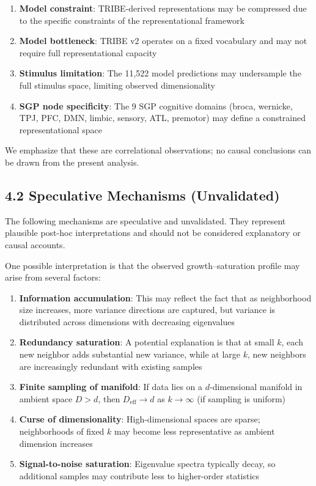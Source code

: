 \begin{enumerate}
	\item \textbf{Model constraint}: TRIBE-derived representations may be compressed due to the specific constraints of the representational framework
	\item \textbf{Model bottleneck}: TRIBE v2 operates on a fixed vocabulary and may not require full representational capacity
	\item \textbf{Stimulus limitation}: The 11,522 model predictions may undersample the full stimulus space, limiting observed dimensionality
	\item \textbf{SGP node specificity}: The 9 SGP cognitive domains (broca, wernicke, TPJ, PFC, DMN, limbic, sensory, ATL, premotor) may define a constrained representational space
\end{enumerate}

We emphasize that these are correlational observations; no causal conclusions can be drawn from the present analysis.

\subsection{4.2 Speculative Mechanisms (Unvalidated)}

The following mechanisms are speculative and unvalidated. They represent plausible post-hoc interpretations and should not be considered explanatory or causal accounts.

One possible interpretation is that the observed growth--saturation profile may arise from several factors:

\begin{enumerate}
	\item \textbf{Information accumulation}: This may reflect the fact that as neighborhood size increases, more variance directions are captured, but variance is distributed across dimensions with decreasing eigenvalues

	\item \textbf{Redundancy saturation}: A potential explanation is that at small $k$, each new neighbor adds substantial new variance, while at large $k$, new neighbors are increasingly redundant with existing samples

	\item \textbf{Finite sampling of manifold}: If data lies on a $d$-dimensional manifold in ambient space $D > d$, then $D_{\mathrm{eff}} \to d$ as $k \to \infty$ (if sampling is uniform)

	\item \textbf{Curse of dimensionality}: High-dimensional spaces are sparse; neighborhoods of fixed $k$ may become less representative as ambient dimension increases

	\item \textbf{Signal-to-noise saturation}: Eigenvalue spectra typically decay, so additional samples may contribute less to higher-order statistics
\end{enumerate}

